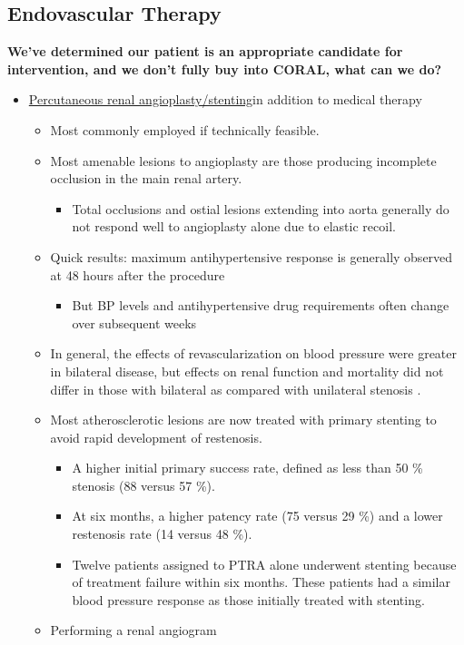 \documentclass[
]{book}
\providecommand{\tightlist}{%
  \setlength{\itemsep}{0pt}\setlength{\parskip}{0pt}}
\begin{document}
\hypertarget{endovascular-therapy}{%
\subsection{Endovascular Therapy}\label{endovascular-therapy}}

\textbf{We've determined our patient is an appropriate candidate for
intervention, and we don't fully buy into CORAL, what can we do?}

\begin{itemize}
\item
  \uline{Percutaneous renal angioplasty/stenting}in addition to
  medical therapy

  \begin{itemize}
  \item
    Most commonly employed if technically feasible.
  \item
    Most amenable lesions to angioplasty are those producing
    incomplete occlusion in the main renal artery.

    \begin{itemize}
    \tightlist
    \item
      Total occlusions and ostial lesions extending into aorta
      generally do not respond well to angioplasty alone due to
      elastic recoil.
    \end{itemize}
  \item
    Quick results: maximum antihypertensive response is generally
    observed at 48 hours after the procedure

    \begin{itemize}
    \tightlist
    \item
      But BP levels and antihypertensive drug requirements often
      change over subsequent weeks
    \end{itemize}
  \item
    In general, the effects of revascularization on blood pressure
    were greater in bilateral disease, but effects on renal function
    and mortality did not differ in those with bilateral as compared
    with unilateral stenosis .
  \item
    Most atherosclerotic lesions are now treated with primary
    stenting to avoid rapid development of restenosis.

    \begin{itemize}
    \item
      A higher initial primary success rate, defined as less than
      50 \% stenosis (88 versus 57 \%).
    \item
      At six months, a higher patency rate (75 versus 29 \%) and a
      lower restenosis rate (14 versus 48 \%).
    \item
      Twelve patients assigned to PTRA alone underwent stenting
      because of treatment failure within six months. These
      patients had a similar blood pressure response as those
      initially treated with stenting.
    \end{itemize}
  \item
    Performing a renal angiogram
    \citep{edwards127RenovascularDisease2019}


\end{itemize}
\end{itemize}
\end{document}
